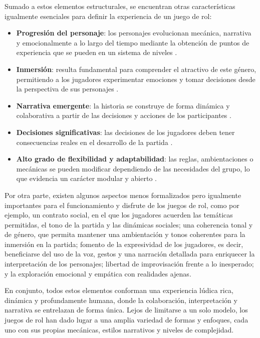 \medskip

Sumado a estos elementos estructurales, se encuentran otras características igualmente esenciales para definir la experiencia de un juego de rol:
\begin{itemize}
	\item \textbf{Progresión del personaje}: los personajes evolucionan mecánica, narrativa y emocionalmente a lo largo del tiempo mediante la obtención de puntos de experiencia que se pueden  en un sistema de niveles \citep{barton2008dungeons}.
	\item \textbf{Inmersión}: resulta fundamental para comprender el atractivo de este género, permitiendo a los jugadores experimentar emociones y tomar decisiones desde la perspectiva de sus personajes \citep{Montola2010}.
	\item \textbf{Narrativa emergente}: la historia se construye de forma dinámica y colaborativa a partir de las decisiones y acciones de los participantes \citep{FineRPG}.
 	\item \textbf{Decisiones significativas}: las decisiones de los jugadores deben tener consecuencias reales en el desarrollo de la partida \citep{tekinbas2003rules}.
	\item \textbf{Alto grado de flexibilidad y adaptabilidad}: las reglas, ambientaciones o mecánicas se pueden modificar dependiendo de las necesidades del grupo, lo que evidencia un carácter modular y abierto \citep{Edwards2001}.
\end{itemize} 

\medskip

Por otra parte, existen algunos aspectos menos formalizados pero igualmente importantes para el funcionamiento y disfrute de los juegos de rol, como por ejemplo, un contrato social, en el que los jugadores acuerden las temáticas permitidas, el tono de la partida y las dinámicas sociales; una coherencia tonal y de género, que permita mantener una ambientación y tonos coherentes para la inmersión en la partida; fomento de la expresividad de los jugadores, es decir, beneficiarse del uso de la voz, gestos y una narración detallada para enriquecer la interpretación de los personajes; libertad de improvisación frente a lo inesperado; y la exploración emocional y empática con realidades ajenas.

\medskip

En conjunto, todos estos elementos conforman una experiencia lúdica rica, dinámica y profundamente humana, donde la colaboración, interpretación y narrativa se entrelazan de forma única. Lejos de limitarse a un solo modelo, los juegos de rol han dado lugar a una amplia variedad de formas y enfoques, cada uno con sus propias mecánicas, estilos narrativos y niveles de complejidad.

